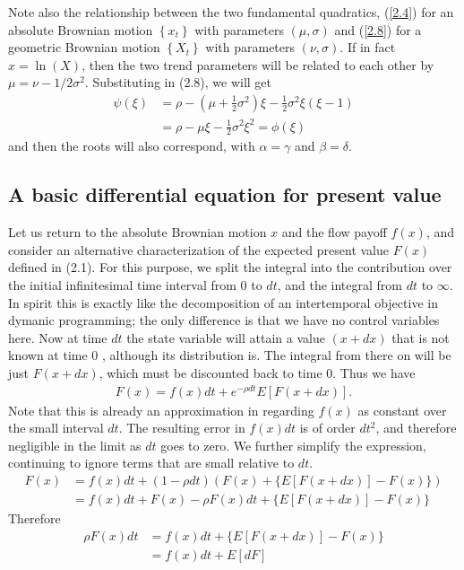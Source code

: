 \documentclass[12pt]{article}
\theoremstyle{definition}
\begin{document}
Note also the relationship between the two fundamental quadratics, (\ref{2.4}) for an absolute Brownian motion $\left\{x_{t}\right\}$ with parameters $(\mu, \sigma)$ and (\ref{2.8}) for a geometric Brownian motion $\left\{X_{t}\right\}$ with parameters $(\nu, \sigma)$. If in fact $x=\ln (X)$, then the two trend parameters will be related to each other by $\mu=\nu-1 / 2 \sigma^{2}$. Substituting in (2.8), we will get
\begin{align*}
\psi(\xi) & =\rho-\left(\mu+\frac{1}{2} \sigma^{2}\right) \xi-\frac{1}{2} \sigma^{2} \xi(\xi-1) \\
& =\rho-\mu \xi-\frac{1}{2} \sigma^{2} \xi^{2}=\phi(\xi)
\end{align*}
and then the roots will also correspond, with $\alpha=\gamma$ and $\beta=\delta$.

\subsection{A basic differential equation for present value}
Let us return to the absolute Brownian motion $x$ and the flow payoff $f(x)$, and consider an alternative characterization of the expected present value $F(x)$ defined in (2.1). For this purpose, we split the integral into the contribution over the initial infinitesimal time interval from 0 to $dt$, and the integral from $dt$ to $\infty$. In spirit this is exactly like the decomposition of an intertemporal objective in dymanic programming; the only difference is that we have no control variables here. Now at time $dt$ the state variable will attain a value $(x+d x)$ that is not known at time 0 , although its distribution is. The integral from there on will be just $F(x+d x)$, which must be discounted back to time 0. Thus we have
\begin{align*}
F(x)=f(x) dt+e^{-\rho dt} E[F(x+dx)].
\end{align*}
Note that this is already an approximation in regarding $f(x)$ as constant over the small interval $dt$. The resulting error in $f(x) d t$ is of order $d t^{2}$, and therefore negligible in the limit as $dt$ goes to zero. We further simplify the expression, continuing to ignore terms that are small relative to $dt$.
\begin{align*}
F(x) & =f(x) d t+(1-\rho d t)(F(x)+\{E[F(x+d x)]-F(x)\}) \\
& =f(x) d t+F(x)-\rho F(x) d t+\{E[F(x+d x)]-F(x)\}
\end{align*}
Therefore
\begin{align}
\rho F(x) d t & =f(x) d t+\{E[F(x+d x)]-F(x)\} \\
& =f(x) d t+E[d F]
\label{2.9}
\end{align}
\end{document}
